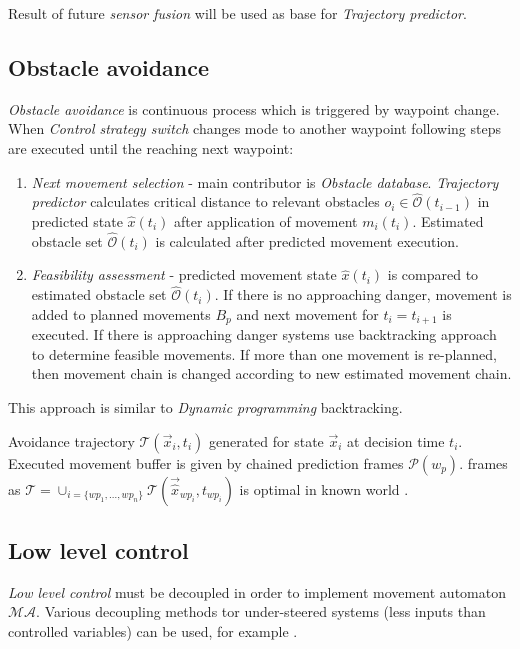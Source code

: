\noindent Result of future \textit{sensor fusion} will be used as base for \textit{Trajectory predictor}.

\subsection*{Obstacle avoidance}
\noindent \textit{Obstacle avoidance} is continuous process which is triggered by waypoint change. When \textit{Control strategy switch} changes mode to another waypoint following steps are executed until the reaching next waypoint:
\begin{enumerate}
    \item \textit{Next movement selection} - main contributor is \textit{Obstacle database}. \textit{Trajectory predictor} calculates critical distance to relevant obstacles $o_i\in\hat{\mathscr{O}}(t_{i-1})$ in predicted state $\hat{x}(t_i)$ after application of movement $m_i(t_i)$. Estimated obstacle set $\hat{\mathscr{O}}(t_i)$ is calculated after predicted movement execution.
    \item \textit{Feasibility assessment} - predicted movement state $\hat{x}(t_i)$ is compared to estimated obstacle set $\hat{\mathscr{O}}(t_i)$. If there is no approaching danger, movement is added to planned movements $B_p$ and next movement for $t_i=t_{i+1}$ is executed. If there is approaching danger systems use backtracking approach to determine feasible movements. If more than one movement is re-planned, then movement chain is changed according to new estimated movement chain.
\end{enumerate}
\noindent This approach is similar to \textit{Dynamic programming} backtracking.

\noindent Avoidance trajectory $\mathscr{T}(\vec{x}_i,t_i)$ generated for state $\vec{x}_i$ at decision time $t_i$. Executed movement buffer is given by chained prediction frames $\mathscr{P}(w_p)$. frames as  $\mathscr{T}= \cup_{i=\{wp_1,\dots,wp_n\}} \mathscr{T}(\vec{\hat{x}}_{wp_i},t_{wp_i})$ is optimal in known world \cite{kochenderfer2008encounter}.

\subsection*{Low level control}
\noindent \textit{Low level control} must be decoupled in order to implement movement automaton $\mathscr{MA}$. Various decoupling methods tor under-steered systems (less inputs than controlled variables) can be used, for example \cite{das2009dynamic}.

